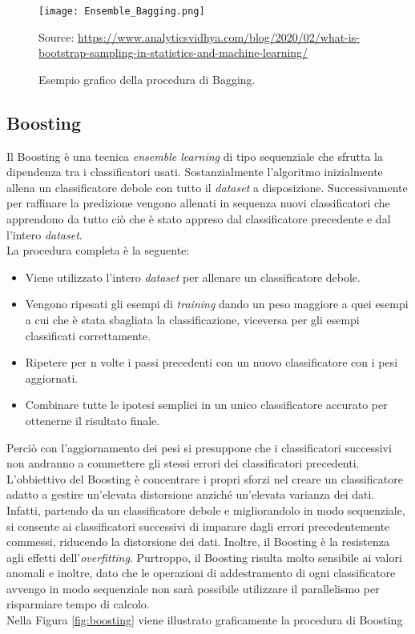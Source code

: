 \begin{figure}[h]
	\begin{center}
		\texttt{[image: Ensemble\_Bagging.png]}
		\caption{Esempio grafico della procedura di Bagging.
		} 
		Source: \url{https://www.analyticsvidhya.com/blog/2020/02/what-is-bootstrap-sampling-in-statistics-and-machine-learning/}\label{fig:bagging}
	\end{center}
\end{figure}

\subsection{Boosting}
Il Boosting \autocite{freund1996experiments} è una tecnica \emph{ensemble learning} di tipo sequenziale che sfrutta la dipendenza tra i classificatori usati. Sostanzialmente l'algoritmo inizialmente allena un classificatore debole con tutto il \emph{dataset} a disposizione. Successivamente per raffinare la predizione vengono allenati in sequenza nuovi classificatori che apprendono da tutto ciò che è stato appreso dal classificatore precedente e dal l'intero \emph{dataset}.\\
La procedura completa è la seguente:
\begin{itemize}
	\item Viene utilizzato l'intero \emph{dataset} per allenare un classificatore debole.
	\item Vengono ripesati gli esempi di \emph{training} dando un peso maggiore a quei esempi a cui che è stata sbagliata la classificazione, viceversa per gli esempi classificati correttamente.
	\item Ripetere per n volte i passi precedenti con un nuovo classificatore con i pesi aggiornati.
	\item Combinare tutte le ipotesi semplici in un unico classificatore accurato per ottenerne il risultato finale.
\end{itemize}
Perciò con l'aggiornamento dei pesi si presuppone che i classificatori successivi non andranno a commettere gli stessi errori dei classificatori precedenti.\\
L'obbiettivo del Boosting è concentrare i propri sforzi nel creare un classificatore adatto a gestire un'elevata distorsione anziché un'elevata varianza dei dati. Infatti, partendo da un classificatore debole e migliorandolo in modo sequenziale, si consente ai classificatori successivi di imparare dagli errori precedentemente commessi, riducendo la distorsione dei dati. Inoltre, il Boosting è la resistenza agli effetti dell'\emph{overfitting}.
Purtroppo, il Boosting risulta molto sensibile ai valori anomali e inoltre, dato che le operazioni di addestramento di ogni classificatore avvengo in modo sequenziale non sarà possibile utilizzare il parallelismo per risparmiare tempo di calcolo.\\
Nella Figura \ref{fig:boosting} viene illustrato graficamente la procedura di Boosting

